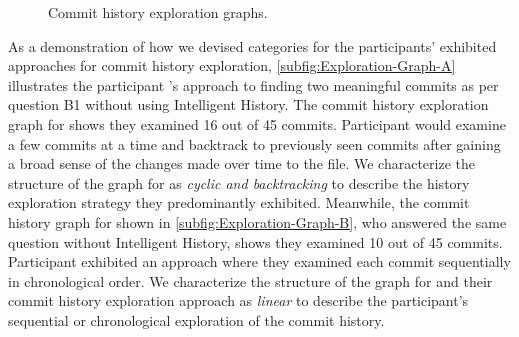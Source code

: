 \begin{figure}[h]
  \centering%
  \qquad
  \caption{
    Commit history exploration graphs.
  }%
  \label{fig:Exploration-Graphs}%
\end{figure}

As a demonstration of how we devised categories for the participants' exhibited approaches for commit history exploration, 
\autoref{subfig:Exploration-Graph-A} illustrates the participant 's approach to finding 
two meaningful commits as per question B1 without using Intelligent History.
The commit history exploration graph for  shows they examined 16 out of 45 commits.
Participant  would examine a few commits at a time and 
backtrack to previously seen commits after gaining a broad sense of the changes made over time to the file.
We characterize the structure of the graph for  as \textit{cyclic and backtracking}
to describe the history exploration strategy they predominantly exhibited.
Meanwhile, the commit history graph for  shown in \autoref{subfig:Exploration-Graph-B}, 
who answered the same question without Intelligent History, shows they examined 10 out of 45 commits.
Participant  exhibited an approach where they examined each commit sequentially in chronological order.
We characterize the structure of the graph for  and their commit history exploration approach as \textit{linear} 
to describe the participant's sequential or chronological exploration of the commit history.

